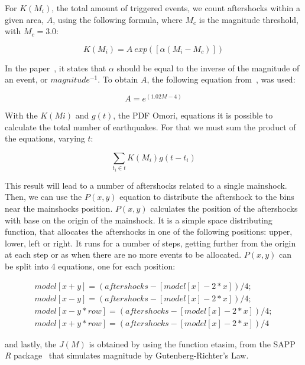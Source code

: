 For $K(M_i)$, the total amount of triggered events, we count aftershocks within a given area, $A$, using the following formula, where $M_c$ is the magnitude threshold, with $M_c=3.0$:

\begin{equation}\label{triggered}
 K(M_i) = A\ exp([\alpha(M_i-M_c)])
\end{equation}

In the paper~\cite{ogata2006space}, it states that $\alpha$ should be equal to the inverse of the magnitude of an event, or $magnitude^{-1}$. To obtain $A$, the following equation from~\cite{yamanaka1990scaling}, was used:

\begin{equation}
A = e^{(1.02M -4)}
\end{equation}

With the $K(Mi)$ and $g(t)$, the PDF Omori, equations it is possible to calculate the total number of earthquakes. For that we must sum the product of the equations, varying $t$:

\begin{equation}
\displaystyle\sum_{t_i \in t} K(M_i)g(t-t_i)
\end{equation}

This result will lead to a number of aftershocks related to a single mainshock. Then, we can use the $P(x,y)$ equation to distribute the aftershock to the bins near the mainshocks position.  $P(x,y)$ calculates the position of the aftershocks with base on the origin of the mainshock. It is a simple space distributing function, that allocates the aftershocks in one of the following positions: upper, lower, left or right. It runs for a number of steps, getting further from the origin at each step or as when there are no more events to be allocated. $P(x,y)$ can be split into 4 equations, one for each position:

\begin{subequations}
\begin{gather*}
        model[x+y] = (aftershocks-[model[x]-2*x])/4;\\
        model[x-y] = (aftershocks-[model[x]-2*x])/4;\\
        model[x-y*row] = (aftershocks-[model[x]-2*x])/4;\\
        model[x+y*row] = (aftershocks-[model[x]-2*x])/4
\end{gather*}
\end{subequations}


and lastly, the $J(M)$ is obtained by using the function etasim, from the SAPP \textit{R} package~\cite{webSapp} that simulates magnitude by Gutenberg-Richter’s Law.

